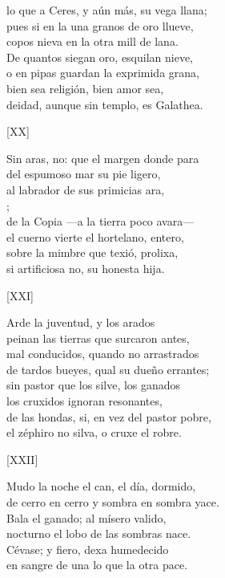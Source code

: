 \documentclass[11pt,a4paper,twoside]{article}
\begin{document}
lo que a Ceres, y aún más, su vega llana;\\
pues si en la una granos de oro llueve,\\
copos nieva en la otra mill de lana.\\
De quantos siegan oro, esquilan nieve,\\
o en pipas guardan la exprimida grana,\\
bien sea religión, bien amor sea,\\
deidad, aunque sin templo, es Galathea.\pend
\begin{center}
	[XX]
\end{center}\pstart
Sin aras, no: que el margen donde para\\
del espumoso mar su pie ligero,\\
al labrador de sus primicias ara,\\
;\\
de la Copia —a la tierra poco avara—\\
el cuerno vierte el hortelano, entero,\\
sobre la mimbre que texió, prolixa,\\
si artificiosa no, su honesta hija.\pend
\begin{center}
	[XXI]
\end{center}\pstart
Arde la juventud, y los arados\\
peinan las tierras que surcaron antes,\\
mal conducidos, quando no arrastrados\\
de tardos bueyes, qual su dueño errantes;\\
sin pastor que los silve, los ganados\\
los cruxidos ignoran resonantes,\\
de las hondas, si, en vez del pastor pobre,\\
el zéphiro no silva, o cruxe el robre.\pend
\begin{center}
	[XXII]
\end{center}\pstart
Mudo la noche el can, el día, dormido,\\
de cerro en cerro y sombra en sombra yace.\\
Bala el ganado; al mísero valido,\\
nocturno el lobo de las sombras nace.\\
Cévase; y fiero, dexa humedecido\\
en sangre de una lo que la otra pace.\\
\end{document}
